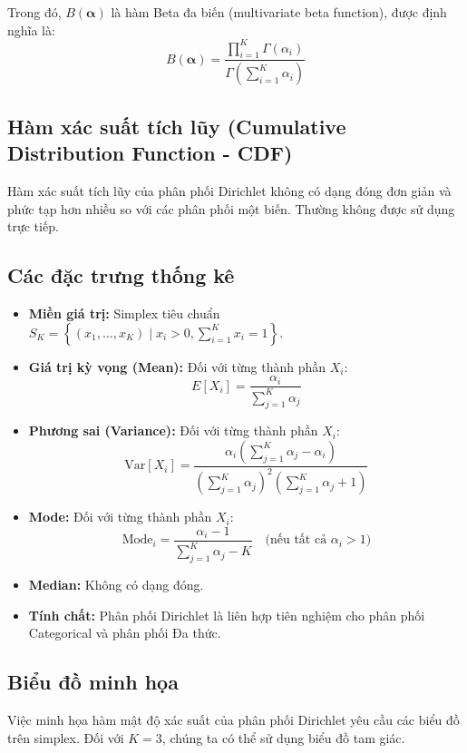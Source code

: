 		Trong đó, $B(\boldsymbol{\alpha})$ là hàm Beta đa biến (multivariate beta function), được định nghĩa là:
		\[ B(\boldsymbol{\alpha}) = \frac{\prod_{i=1}^K \Gamma(\alpha_i)}{\Gamma\left(\sum_{i=1}^K \alpha_i\right)} \]
	
	\subsection{Hàm xác suất tích lũy (Cumulative Distribution Function - CDF)}
	Hàm xác suất tích lũy của phân phối Dirichlet không có dạng đóng đơn giản và phức tạp hơn nhiều so với các phân phối một biến. Thường không được sử dụng trực tiếp.
	
	\subsection{Các đặc trưng thống kê}
	\begin{itemize}[leftmargin=*]
		\item \textbf{Miền giá trị:} Simplex tiêu chuẩn $S_K = \left\{ (x_1, \dots, x_K) \mid x_i > 0, \sum_{i=1}^K x_i = 1 \right\}$.
		\item \textbf{Giá trị kỳ vọng (Mean):} Đối với từng thành phần $X_i$:
		\[ E[X_i] = \frac{\alpha_i}{\sum_{j=1}^K \alpha_j} \]
		\item \textbf{Phương sai (Variance):} Đối với từng thành phần $X_i$:
		\[ \text{Var}[X_i] = \frac{\alpha_i \left( \sum_{j=1}^K \alpha_j - \alpha_i \right)}{\left( \sum_{j=1}^K \alpha_j \right)^2 \left( \sum_{j=1}^K \alpha_j + 1 \right)} \]
		\item \textbf{Mode:} Đối với từng thành phần $X_i$:
		\[ \text{Mode}_i = \frac{\alpha_i-1}{\sum_{j=1}^K \alpha_j - K} \quad \text{(nếu tất cả } \alpha_i > 1 \text{)} \]
		\item \textbf{Median:} Không có dạng đóng.
		\item \textbf{Tính chất:} Phân phối Dirichlet là liên hợp tiên nghiệm cho phân phối Categorical và phân phối Đa thức.
	\end{itemize}
	
	\subsection{Biểu đồ minh họa}
	Việc minh họa hàm mật độ xác suất của phân phối Dirichlet yêu cầu các biểu đồ trên simplex. Đối với $K=3$, chúng ta có thể sử dụng biểu đồ tam giác.
	
